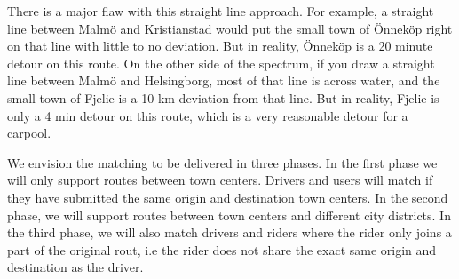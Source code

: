 \documentclass{article}
\begin{document}
There is a major flaw with this straight line approach. For example, a straight line between Malmö and Kristianstad would put the small town of Önneköp right on that line with little to no deviation. But in reality, Önneköp is a 20 minute detour on this route. On the other side of the spectrum, if you draw a straight line between Malmö and Helsingborg, most of that line is across water, and the small town of Fjelie is a 10 km deviation from that line. But in reality, Fjelie is only a 4 min detour on this route, which is a very reasonable detour for a carpool.

We envision the matching to be delivered in three phases. In the first phase we will only support routes between town centers. Drivers and users will match if they have submitted the same origin and destination town centers. In the second phase, we will support routes between town centers and different city districts. In the third phase, we will also match drivers and riders where the rider only joins a part of the original rout, i.e the rider does not share the exact same origin and destination as the driver.

\end{document}
